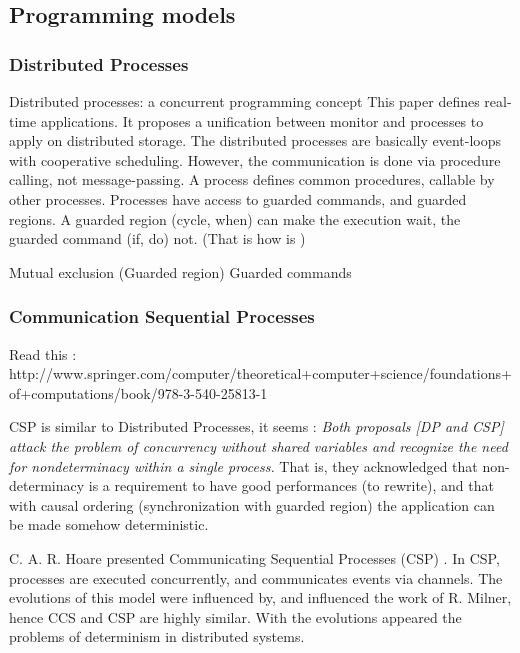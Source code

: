 \subsection{Programming models}

\subsubsection{Distributed Processes}

Distributed processes: a concurrent programming concept \cite{Hansen1978}
This paper defines real-time applications.
It proposes a unification between monitor and processes to apply on distributed storage.
The distributed processes are basically event-loops with cooperative scheduling.
However, the communication is done via procedure calling, not message-passing.
A process defines common procedures, callable by other processes.
Processes have access to guarded commands, and guarded regions.
A guarded region (cycle, when) can make the execution wait, the guarded command (if, do) not.
(That is how is )

Mutual exclusion (Guarded region) \cite{Hansen1978a} \cite{Hoare2002}
Guarded commands \cite{Dijkstra1975}

\subsubsection{Communication Sequential Processes}

Read this : http://www.springer.com/computer/theoretical+computer+science/foundations+of+computations/book/978-3-540-25813-1

CSP is similar to Distributed Processes, it seems :
\textit{Both proposals [DP and CSP] attack the problem of concurrency without shared variables and recognize the need for nondeterminacy within a single process.}
That is, they acknowledged that non-determinacy is a requirement to have good performances (to rewrite), and that with causal ordering (synchronization with guarded region) the application can be made somehow deterministic.

C. A. R. Hoare presented Communicating Sequential Processes (CSP) \cite{Hoare1978, Brookes1984}.
In CSP, processes are executed concurrently, and communicates events via channels.
The evolutions of this model were influenced by, and influenced the work of R. Milner, hence CCS and CSP are highly similar.
With the evolutions appeared the problems of determinism in distributed systems.\cite{Brookes1984}


